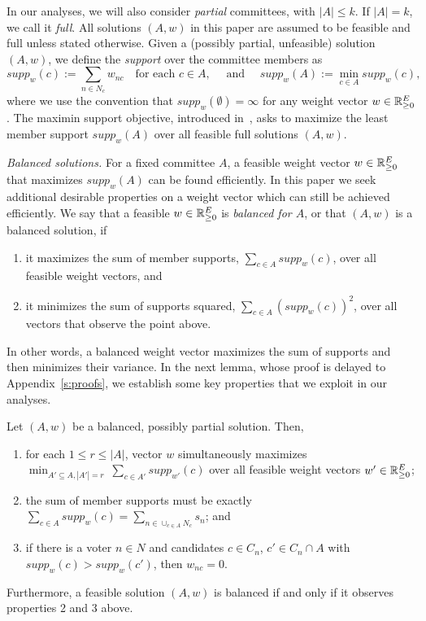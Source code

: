 In our analyses, we will also consider \emph{partial} committees, with $|A|\leq k$. If $|A|=k$, we call it \emph{full}. 
All solutions $(A,w)$ in this paper are assumed to be feasible and full unless stated otherwise. 
Given a (possibly partial, unfeasible) solution $(A,w)$, we define the \emph{support} over the committee members as 
\begin{equation}
supp_w(c):=\sum_{n\in N_c} w_{nc} \quad \text{for each $c\in A, \quad$ and } \quad supp_w(A):=\min_{c\in A} supp_w(c), \label{eq:support}
\end{equation}
where we use the convention that $supp_w(\emptyset)=\infty$ for any weight vector $w\in\mathbb{R}_{\geq 0}^E$. 
The maximin support objective, introduced in~\cite{sanchez2016maximin}, asks to maximize the least member support $supp_w(A)$ over all feasible full solutions $(A,w)$. 

\emph{Balanced solutions.}
For a fixed committee $A$, a feasible weight vector $w\in\mathbb{R}_{\geq 0}^E$ that maximizes $supp_w(A)$ can be found efficiently. In this paper we seek additional desirable properties on a weight vector which can still be achieved efficiently. We say that a feasible $w\in\mathbb{R}_{\geq 0}^E$ is \emph{balanced for $A$}, or that $(A,w)$ is a balanced solution, if
\begin{enumerate}
    \item it maximizes the sum of member supports, $\sum_{c\in A} supp_w(c)$, over all feasible weight vectors, and 
    \item it minimizes the sum of supports squared, $\sum_{c\in A} (supp_w(c))^2$, over all vectors that observe the point above. 
\end{enumerate}

In other words, a balanced weight vector maximizes the sum of supports and then minimizes their variance. 
In the next lemma, whose proof is delayed to Appendix~\ref{s:proofs}, we establish some key properties that we exploit in our analyses. 

\begin{lemma}\label{lem:balanced}
Let $(A,w)$ be a balanced, possibly partial solution. Then,
\begin{enumerate}
    \item for each $1\leq r\leq |A|$, vector $w$ simultaneously maximizes $\min_{A'\subseteq A, |A'|=r} \ \sum_{c\in A'} supp_{w'}(c)$ over all feasible weight vectors $w'\in\mathbb{R}_{\geq 0}^E$; 
		\item the sum of member supports must be exactly $\sum_{c\in A} supp_w(c)=\sum_{n\in \cup_{c\in A} N_c} s_n$; and
    \item if there is a voter $n\in N$ and candidates $c\in C_n$, $c'\in C_n\cap A$ with $supp_w(c)>supp_w(c')$, then $w_{nc}=0$.
\end{enumerate}
Furthermore, a feasible solution $(A,w)$ is balanced if and only if it observes properties 2 and 3 above.
\end{lemma}

